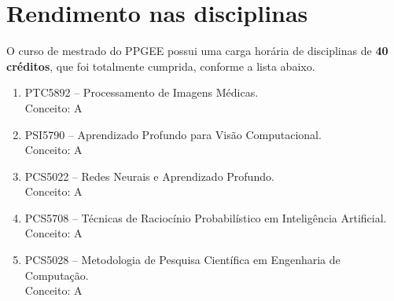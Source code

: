 \section{Rendimento nas disciplinas}
\label{sec:disciplinas}

O curso de mestrado do PPGEE possui uma carga horária de disciplinas de \textbf{40 créditos}, que foi totalmente cumprida, conforme a lista abaixo.

\begin{enumerate}
  \item PTC5892 -- Processamento de Imagens Médicas.\\Conceito: A
  \item PSI5790 -- Aprendizado Profundo para Visão Computacional.\\Conceito: A
  \item PCS5022 -- Redes Neurais e Aprendizado Profundo.\\Conceito: A
  \item PCS5708 -- Técnicas de Raciocínio Probabilístico em Inteligência Artificial.\\Conceito: A
  \item PCS5028 -- Metodologia de Pesquisa Científica em Engenharia de Computação.\\Conceito: A
\end{enumerate}

\chaptersep

